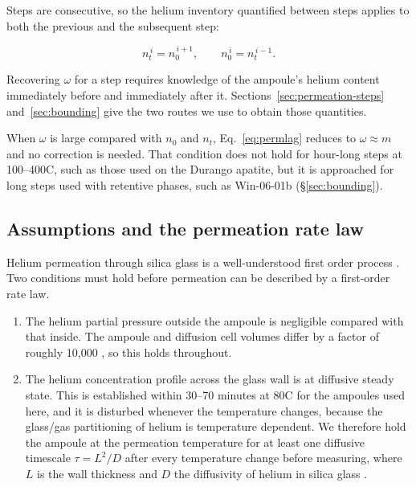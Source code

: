 Steps are consecutive, so the helium inventory quantified between steps applies to both the previous and the subsequent step:

\begin{equation}
\label{eq:carry}
n_{t}^{\,i} = n_{0}^{\,i+1}, \qquad n_{0}^{\,i} = n_{t}^{\,i-1} .
\end{equation}

Recovering $\omega$ for a step requires knowledge of the ampoule's helium content immediately before and immediately after it. Sections~\ref{sec:permeation-steps} and~\ref{sec:bounding} give the two routes we use to obtain those quantities.

When $\omega$ is large compared with $n_{0}$ and $n_{t}$, Eq.~\eqref{eq:permlag} reduces to $\omega \approx m$ and no correction is needed. That condition does not hold for hour-long steps at 100--400\textdegree C, such as those used on the Durango apatite, but it is approached for long steps used with retentive phases, such as Win-06-01b (\S\ref{sec:bounding}).

\subsection{Assumptions and the permeation rate law}\label{sec:assumptions}

Helium permeation through silica glass is a well-understood first order process \citep{norton1953,altemose1961,swets1961,masaryk1968}. Two conditions must hold before permeation can be described by a first-order rate law.

\begin{enumerate}
\item The helium partial pressure outside the ampoule is negligible compared with that inside. The ampoule and diffusion cell volumes differ by a factor of roughly 10,000 \citep{farley1999}, so this holds throughout.
\item The helium concentration profile across the glass wall is at diffusive steady state. This is established within 30--70 minutes at 80\textdegree C for the ampoules used here, and it is disturbed whenever the temperature changes, because the glass/gas partitioning of helium is temperature dependent. We therefore hold the ampoule at the permeation temperature for at least one diffusive timescale $\tau = L^{2}/D$ after every temperature change before measuring, where $L$ is the wall thickness and $D$ the diffusivity of helium in silica glass \citep{swets1961}.
\end{enumerate}

